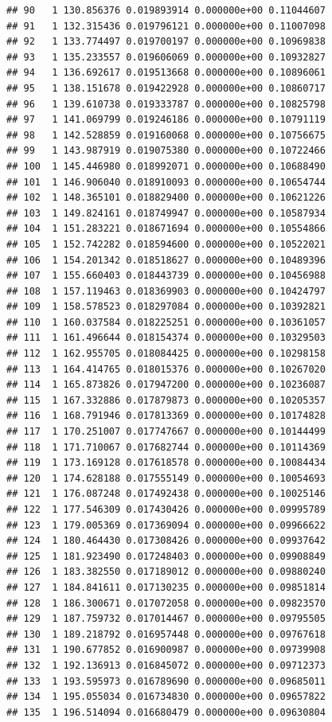 \documentclass[article]{jss}\usepackage[]{graphicx}\usepackage[]{xcolor}
\makeatletter
\newenvironment{kframe}{%
 \def\at@end@of@kframe{}%
 \ifinner\ifhmode%
  \def\at@end@of@kframe{\end{minipage}}%
  \begin{minipage}{\columnwidth}%
 \fi\fi%
 \def\FrameCommand##1{\hskip\@totalleftmargin \hskip-\fboxsep
 \colorbox{shadecolor}{##1}\hskip-\fboxsep
     \hskip-\linewidth \hskip-\@totalleftmargin \hskip\columnwidth}%
 \MakeFramed {\advance\hsize-\width
   \@totalleftmargin\z@ \linewidth\hsize
   \@setminipage}}%
 {\par\unskip\endMakeFramed%
 \at@end@of@kframe}
\newenvironment{knitrout}{}{} %
\makeatother
\begin{document}
\begin{knitrout}
\begin{kframe}
\begin{verbatim}
## 90   1 130.856376 0.019893914 0.000000e+00 0.11044607
## 91   1 132.315436 0.019796121 0.000000e+00 0.11007098
## 92   1 133.774497 0.019700197 0.000000e+00 0.10969838
## 93   1 135.233557 0.019606069 0.000000e+00 0.10932827
## 94   1 136.692617 0.019513668 0.000000e+00 0.10896061
## 95   1 138.151678 0.019422928 0.000000e+00 0.10860717
## 96   1 139.610738 0.019333787 0.000000e+00 0.10825798
## 97   1 141.069799 0.019246186 0.000000e+00 0.10791119
## 98   1 142.528859 0.019160068 0.000000e+00 0.10756675
## 99   1 143.987919 0.019075380 0.000000e+00 0.10722466
## 100  1 145.446980 0.018992071 0.000000e+00 0.10688490
## 101  1 146.906040 0.018910093 0.000000e+00 0.10654744
## 102  1 148.365101 0.018829400 0.000000e+00 0.10621226
## 103  1 149.824161 0.018749947 0.000000e+00 0.10587934
## 104  1 151.283221 0.018671694 0.000000e+00 0.10554866
## 105  1 152.742282 0.018594600 0.000000e+00 0.10522021
## 106  1 154.201342 0.018518627 0.000000e+00 0.10489396
## 107  1 155.660403 0.018443739 0.000000e+00 0.10456988
## 108  1 157.119463 0.018369903 0.000000e+00 0.10424797
## 109  1 158.578523 0.018297084 0.000000e+00 0.10392821
## 110  1 160.037584 0.018225251 0.000000e+00 0.10361057
## 111  1 161.496644 0.018154374 0.000000e+00 0.10329503
## 112  1 162.955705 0.018084425 0.000000e+00 0.10298158
## 113  1 164.414765 0.018015376 0.000000e+00 0.10267020
## 114  1 165.873826 0.017947200 0.000000e+00 0.10236087
## 115  1 167.332886 0.017879873 0.000000e+00 0.10205357
## 116  1 168.791946 0.017813369 0.000000e+00 0.10174828
## 117  1 170.251007 0.017747667 0.000000e+00 0.10144499
## 118  1 171.710067 0.017682744 0.000000e+00 0.10114369
## 119  1 173.169128 0.017618578 0.000000e+00 0.10084434
## 120  1 174.628188 0.017555149 0.000000e+00 0.10054693
## 121  1 176.087248 0.017492438 0.000000e+00 0.10025146
## 122  1 177.546309 0.017430426 0.000000e+00 0.09995789
## 123  1 179.005369 0.017369094 0.000000e+00 0.09966622
## 124  1 180.464430 0.017308426 0.000000e+00 0.09937642
## 125  1 181.923490 0.017248403 0.000000e+00 0.09908849
## 126  1 183.382550 0.017189012 0.000000e+00 0.09880240
## 127  1 184.841611 0.017130235 0.000000e+00 0.09851814
## 128  1 186.300671 0.017072058 0.000000e+00 0.09823570
## 129  1 187.759732 0.017014467 0.000000e+00 0.09795505
## 130  1 189.218792 0.016957448 0.000000e+00 0.09767618
## 131  1 190.677852 0.016900987 0.000000e+00 0.09739908
## 132  1 192.136913 0.016845072 0.000000e+00 0.09712373
## 133  1 193.595973 0.016789690 0.000000e+00 0.09685011
## 134  1 195.055034 0.016734830 0.000000e+00 0.09657822
## 135  1 196.514094 0.016680479 0.000000e+00 0.09630804

\end{verbatim}
\end{kframe}
\end{knitrout}
\end{document}
